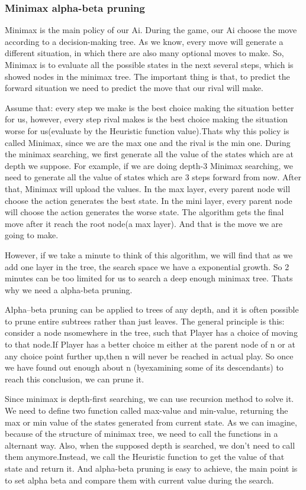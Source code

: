 \documentclass[aps,letterpaper,10pt]{revtex4}
\begin{document}
\subsubsection{Minimax alpha-beta pruning}
Minimax is the main policy of our Ai. During the game, our Ai choose the move according to a decision-making tree. As we know, every move will generate a different situation, in which there are also many optional moves to make. So, Minimax is to evaluate all the possible states in the next several steps, which is showed nodes in the minimax tree. The important thing is that, to predict the forward situation we need to predict the move that our rival will make.
\par
Assume that: every step we make is the best choice making the situation better for us, however, every step rival makes is the best choice making the situation worse for us(evaluate by the Heuristic function value).Thats why this policy is called Minimax, since we are the max one and the rival is the min one. During the minimax searching, we first generate all the value of the states which are at depth we suppose. For example, if we are doing depth-3 Minimax searching, we need to generate all the value of states which are 3 steps forward from now. After that, Minimax will upload the values. In the max layer, every parent node will choose the action generates the best state. In the mini layer, every parent node will choose the action generates the worse state. The algorithm gets the final move after it reach the root node(a max layer). And that is the move we are going to make.
\par
However, if we take a minute to think of this algorithm, we will find that as we add one layer in the tree, the search space we have a exponential growth. So 2 minutes can be too limited for us to search a deep enough minimax tree. Thats why we need a alpha-beta pruning.
\par
Alpha–beta pruning can be applied to trees of any depth, and it is often possible to
prune entire subtrees rather than just leaves. The general principle is this: consider a node nsomewhere in the tree, such that Player has a choice of moving to that node.If Player has a better choice m either at the parent node of n or at any choice point further up,then n will never be reached in actual play. So once we have found out enough about n (byexamining some of its descendants) to reach this conclusion, we can prune it.
\par
Since minimax is depth-first searching, we can use recursion method to solve it. We need to define two function called max-value and min-value, returning the max or min value of the states generated from current state. As we can imagine, because of the structure of minimax tree, we need to call the functions in a alternant way. Also, when the supposed depth is searched, we don't need to call them anymore.Instead, we call the Heuristic function to get the value of that state and return it. And alpha-beta pruning is easy to achieve, the main point is to set alpha beta and compare them with current value during the search.
\end{document}
